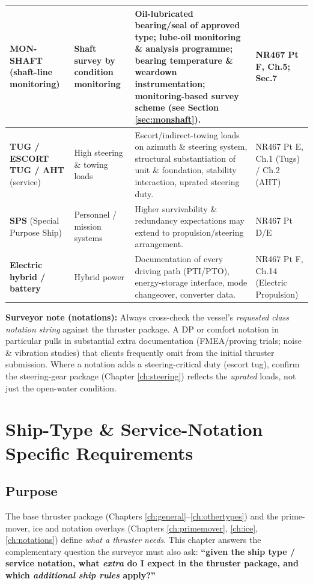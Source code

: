 \documentclass[11pt,a4paper]{report}
\begin{document}
\begin{longtable}{|p{2.8cm}|p{3.7cm}|p{5.8cm}|p{1.9cm}|}
\textbf{MON-SHAFT} (shaft-line monitoring) & Shaft survey by condition monitoring &
Oil-lubricated bearing/seal of approved type; lube-oil monitoring \& analysis
programme; bearing temperature \& weardown instrumentation; monitoring-based
survey scheme (see Section \ref{sec:monshaft}). & NR467 Pt F, Ch.5; Sec.7 \\
\hline

\textbf{TUG / ESCORT TUG / AHT} (service) & High steering \& towing loads &
Escort/indirect-towing loads on azimuth \& steering system, structural
substantiation of unit \& foundation, stability interaction, uprated steering
duty. & NR467 Pt E, Ch.1 (Tugs) / Ch.2 (AHT) \\
\hline

\textbf{SPS} (Special Purpose Ship) & Personnel / mission systems &
Higher survivability \& redundancy expectations may extend to propulsion/steering
arrangement. & NR467 Pt D/E \\
\hline

\textbf{Electric hybrid / battery} & Hybrid power &
Documentation of every driving path (PTI/PTO), energy-storage interface, mode
changeover, converter data. & NR467 Pt F, Ch.14 (Electric Propulsion) \\
\hline

\end{longtable}

\noindent\textbf{Surveyor note (notations):} Always cross-check the vessel's
\emph{requested class notation string} against the thruster package. A DP or
comfort notation in particular pulls in substantial extra documentation
(FMEA/proving trials; noise \& vibration studies) that clients frequently omit
from the initial thruster submission. Where a notation adds a steering-critical
duty (escort tug), confirm the steering-gear package (Chapter \ref{ch:steering})
reflects the \emph{uprated} loads, not just the open-water condition.

\newpage

\chapter{Ship-Type \& Service-Notation Specific Requirements}
\label{ch:shiptype}

\section{Purpose}

The base thruster package (Chapters \ref{ch:general}--\ref{ch:othertypes}) and the
prime-mover, ice and notation overlays (Chapters
\ref{ch:primemover}, \ref{ch:ice}, \ref{ch:notations}) define \emph{what a
thruster needs}. This chapter answers the complementary question the surveyor
must also ask: \textbf{``given the ship type / service notation, what
\emph{extra} do I expect in the thruster package, and which \emph{additional ship
rules} apply?''}
\end{document}
